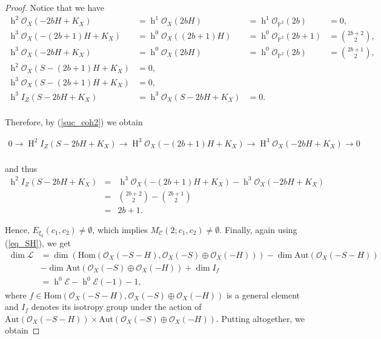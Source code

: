 \documentclass[11pt,twoside]{amsart}
\theoremstyle{definition}
\newcommand {\Hom}{\mathrm{Hom}}
\newcommand {\Aut}{\mathrm{Aut}}
\newcommand{\h}{\operatorname{h}}
\newcommand{\Ho}{\operatorname{H}}
\begin{document}
\begin{proof}
Notice that we have
\[
\begin{array}{llll}
    \h^2\mathcal{O}_X(-2bH+K_X) &= \h^1\mathcal{O}_X(2bH) &= \h^1\mathcal{O}_{\mathbb{P}^2}(2b) &= 0, \\
    \h^{3}\mathcal{O}_X(-(2b+1)H+K_X) &= \h^0\mathcal{O}_X((2b+1)H) &= \h^0\mathcal{O}_{\mathbb{P}^2}(2b+1) &= \binom{2b+2}{2}, \\
    \h^{3}\mathcal{O}_X(-2bH+K_X) &= \h^0\mathcal{O}_X(2bH) &= \h^0\mathcal{O}_{\mathbb{P}^2}(2b) &= \binom{2b+1}{2}, \\
    \h^2\mathcal{O}_X(S-(2b+1)H+K_X) &= 0, & & \\
    \h^{3}\mathcal{O}_X(S-(2b+1)H+K_X) &=0,&  & \\
    \h^{3}I_Z(S-2bH+K_X) &=\h^{3}\mathcal{O}_X(S-2bH+K_X)&= 0.  & \\
\end{array}
\]

Therefore, by (\ref{suc_coh2}) we obtain 

$\begin{array}{l}
\label{suc_coh}
0 \rightarrow \Ho^2I_Z(S-2bH+K_X) 
\rightarrow \Ho^{3}\mathcal{O}_X(-(2b+1)H+K_X) \rightarrow \Ho^{3}\mathcal{O}_X(-2bH+K_X) \rightarrow 0\\
\end{array}$

and thus 
\[
\begin{array}{rcl}
\h^2I_Z(S-2bH+K_X) &=& \h^{3}\mathcal{O}_X(-(2b+1)H+K_X) - \h^{3}\mathcal{O}_X(-2bH+K_X) \\
&=& \binom{2b+2}{2} - \binom{2b+1}{2} \\
&=& 2b+1.
\end{array}
\]


Hence,   $E_{\xi_b}(c_1,c_2)\neq\emptyset$, which implies   $M_{\mathcal{C}}(2;c_1,c_2)\neq\emptyset$.
Finally, again using (\ref{eq_SH}), %
we get 
\[
\begin{array}{lll}
\dim\mathcal{L} &= \dim(\Hom(\mathcal{O}_X(-S-H),\mathcal{O}_X(-S)\oplus\mathcal{O}_X(-H)))-\dim\Aut(\mathcal{O}_X(-S-H))\\
&-\dim\Aut(\mathcal{O}_X(-S)\oplus \mathcal{O}_X(-H))+\dim I_f \\
&=  \h^0\mathcal{E}-\h^0\mathcal{E}(-1)-1,
\end{array}
\]
where $f\in\Hom(\mathcal{O}_X(-S-H),\mathcal{O}_X(-S)\oplus\mathcal{O}_X(-H))$ is a general element and $I_f$ denotes its isotropy group under the action of $\Aut(\mathcal{O}_X(-S-H))\times\Aut(\mathcal{O}_X(-S)\oplus\mathcal{O}_X(-H))$. Putting altogether, we obtain


\end{proof}
\end{document}
